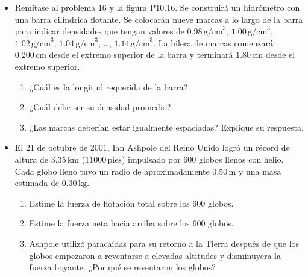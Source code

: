\documentclass[11pt,a4paper]{article}
\begin{document}
\begin{itemize}
    \item[\textbf{17.}] Remítase al problema 16 y la figura P10.16. Se construirá un hidrómetro con una barra cilíndrica flotante. Se colocarán nueve marcas a lo largo de la barra para indicar densidades que tengan valores de \(0.98\,\text{g/cm}^3\), \(1.00\,\text{g/cm}^3\), \(1.02\,\text{g/cm}^3\), \(1.04\,\text{g/cm}^3\), \dots, \(1.14\,\text{g/cm}^3\). La hilera de marcas comenzará \(0.200\,\text{cm}\) desde el extremo superior de la barra y terminará \(1.80\,\text{cm}\) desde el extremo superior.
    \begin{enumerate}
        \item ¿Cuál es la longitud requerida de la barra?
        \item ¿Cuál debe ser su densidad promedio?
        \item ¿Las marcas deberían estar igualmente espaciadas? Explique su respuesta.
    \end{enumerate}
    \vspace*{8cm}
    
    \item[\textbf{18.}] El 21 de octubre de 2001, Ian Ashpole del Reino Unido logró un récord de altura de \(3.35\,\text{km}\) (\(11000\,\text{pies}\)) impulsado por 600 globos llenos con helio. Cada globo lleno tuvo un radio de aproximadamente \(0.50\,\text{m}\) y una masa estimada de \(0.30\,\text{kg}\).
    \begin{enumerate}
        \item Estime la fuerza de flotación total sobre los 600 globos.
        \item Estime la fuerza neta hacia arriba sobre los 600 globos.
        \item Ashpole utilizó paracaídas para su retorno a la Tierra después de que los globos empezaron a reventarse a elevadas altitudes y disminuyera la fuerza boyante. ¿Por qué se reventaron los globos?
    \end{enumerate}
    \vspace*{7cm}
    

\end{itemize}
\end{document}
